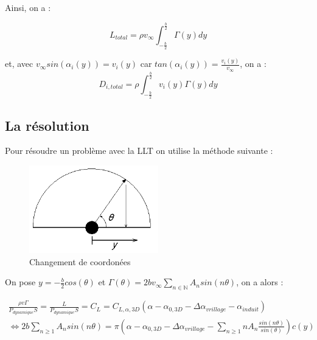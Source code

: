 Ainsi, on a :

\begin{equation}
    L_{total} = \rho v_{\infty} \int_{-\frac{b}{2}}^{\frac{b}{2}} \Gamma(y) dy
\end{equation}

et, avec $v_{\infty} sin(\alpha_i(y)) = v_i(y)$ car $tan(\alpha_i(y)) = \frac{v_i(y)}{v_{\infty}}$, on a :
\begin{equation}
    D_{i,total} = \rho \int_{-\frac{b}{2}}^{\frac{b}{2}} v_{i}(y)\Gamma(y) dy
\end{equation}

\subsection{La résolution} 
\label{subsec:Ch1.1.1}

Pour résoudre un problème avec la LLT on utilise la méthode suivante : 

\begin{figure}[H]
    \centering
    \includegraphics[width=0.5\textwidth]{Pics/01 - Basses Fidélités/Prandtl-lifting-line-coordinate-change.png}  
    \caption{Changement de coordonées}
    \label{fig:llt fchange coord}
\end{figure}

On pose $y = -\frac{b}{2}cos(\theta)$ et $\Gamma(\theta) = 2bv_{\infty} \sum_{n \in \mathbb{N}}^{} A_n sin(n\theta)$, on a alors :

\begin{equation}
    \begin{split}
        \frac{\rho v \Gamma}{P_{dynamique} S} = \frac{L}{P_{dynamique} S} = C_L = C_{L,\alpha,3D}(\alpha - \alpha_{0,3D} - \Delta\alpha_{vrillage} - \alpha_{induit}) \\
        \Leftrightarrow 2b\sum_{n \geq 1}^{} A_n sin(n\theta) = \pi (\alpha - \alpha_{0,3D} - \Delta\alpha_{vrillage} - \sum_{n \geq 1}^{}n A_n \frac{sin(n\theta)}{sin(\theta)})c(y)
    \end{split}
    \label{eq: LLT}
\end{equation}

